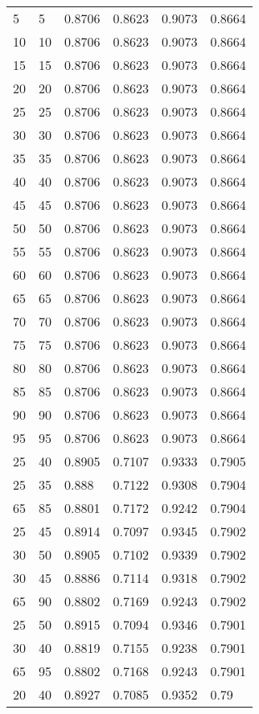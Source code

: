 \begin{center}
\begin{longtable}{|l|l|l|l|l|l|}
5  & 5  & 0.8706 & 0.8623 & 0.9073 & 0.8664 \\
10 & 10 & 0.8706 & 0.8623 & 0.9073 & 0.8664 \\
15 & 15 & 0.8706 & 0.8623 & 0.9073 & 0.8664 \\
20 & 20 & 0.8706 & 0.8623 & 0.9073 & 0.8664 \\
25 & 25 & 0.8706 & 0.8623 & 0.9073 & 0.8664 \\
30 & 30 & 0.8706 & 0.8623 & 0.9073 & 0.8664 \\
35 & 35 & 0.8706 & 0.8623 & 0.9073 & 0.8664 \\
40 & 40 & 0.8706 & 0.8623 & 0.9073 & 0.8664 \\
45 & 45 & 0.8706 & 0.8623 & 0.9073 & 0.8664 \\
50 & 50 & 0.8706 & 0.8623 & 0.9073 & 0.8664 \\
55 & 55 & 0.8706 & 0.8623 & 0.9073 & 0.8664 \\
60 & 60 & 0.8706 & 0.8623 & 0.9073 & 0.8664 \\
65 & 65 & 0.8706 & 0.8623 & 0.9073 & 0.8664 \\
70 & 70 & 0.8706 & 0.8623 & 0.9073 & 0.8664 \\
75 & 75 & 0.8706 & 0.8623 & 0.9073 & 0.8664 \\
80 & 80 & 0.8706 & 0.8623 & 0.9073 & 0.8664 \\
85 & 85 & 0.8706 & 0.8623 & 0.9073 & 0.8664 \\
90 & 90 & 0.8706 & 0.8623 & 0.9073 & 0.8664 \\
95 & 95 & 0.8706 & 0.8623 & 0.9073 & 0.8664 \\
25 & 40 & 0.8905 & 0.7107 & 0.9333 & 0.7905 \\
25 & 35 & 0.888  & 0.7122 & 0.9308 & 0.7904 \\
65 & 85 & 0.8801 & 0.7172 & 0.9242 & 0.7904 \\
25 & 45 & 0.8914 & 0.7097 & 0.9345 & 0.7902 \\
30 & 50 & 0.8905 & 0.7102 & 0.9339 & 0.7902 \\
30 & 45 & 0.8886 & 0.7114 & 0.9318 & 0.7902 \\
65 & 90 & 0.8802 & 0.7169 & 0.9243 & 0.7902 \\
25 & 50 & 0.8915 & 0.7094 & 0.9346 & 0.7901 \\
30 & 40 & 0.8819 & 0.7155 & 0.9238 & 0.7901 \\
65 & 95 & 0.8802 & 0.7168 & 0.9243 & 0.7901 \\
20 & 40 & 0.8927 & 0.7085 & 0.9352 & 0.79   \\

\end{longtable}
\end{center}
